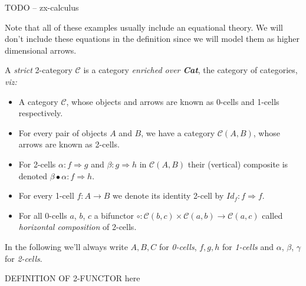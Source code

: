 \documentclass[a4paper]{article}
\begin{document}
\begin{example}  \label{ex:zx-calculus}
  TODO -- zx-calculus
\end{example}

\noindent
Note that all of these examples usually include an equational theory.
We will don't include these equations in the  definition since we will
model them as higher dimensional arrows.


\begin{definition}  \label{def:strict-two-cat}
A \emph{strict} 2-category $\mathcal{C}$ is a category \emph{enriched over
  \textbf{Cat}}, the category of categories, \emph{viz:}
\begin{itemize}
\item A category $\mathcal{C}$, whose objects and arrows are known as
  0-cells and 1-cells respectively.
\item For every pair of objects $A$ and $B$, we have a
  category $\mathcal{C}(A, B)$, whose arrows are known as 2-cells.
\item For 2-cells $\alpha : f \Rightarrow g$ and $\beta : g
  \Rightarrow h$ in $\mathcal{C}(A,B)$ their (vertical) composite is denoted
  $\beta\bullet\alpha : f \Rightarrow h$.
\item For every 1-cell $f:A\to B$ we denote its identity 2-cell by
  $Id_f:f \Rightarrow f$.
\item For all 0-cells $a$, $b$, $c$ a bifunctor $\circ: \mathcal{C}(b, c)
  \times \mathcal{C}(a, b) \to \mathcal{C}(a, c)$ called \emph{horizontal
    composition} of 2-cells.
\end{itemize}
\end{definition}

\noindent
In the following we'll always write $A, B, C$ for \emph{0-cells}, $f,
g, h$ for \emph{1-cells} and $\alpha$, $\beta$, $\gamma$ for
\emph{2-cells}.

\begin{definition}
  \label{def:two-functor}
  DEFINITION OF 2-FUNCTOR here
\end{definition}

\end{document}
